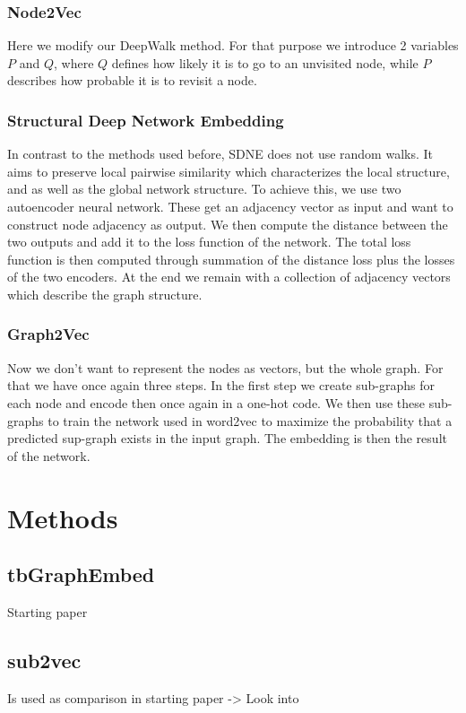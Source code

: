 \documentclass[sigconf]{acmart}
\begin{document}
\subsubsection{Node2Vec}
Here we modify our DeepWalk method. For that purpose we introduce 2 variables \(P\) and \(Q\), where \(Q\) defines how likely it is to go to an unvisited node,
while \(P\) describes how probable it is to revisit a node.

\subsubsection{Structural Deep Network Embedding}
In contrast to the methods used before, SDNE does not use random walks. It aims to preserve local pairwise similarity which characterizes the local structure, and 
as well as the global network structure.
To achieve this, we use two autoencoder neural network. These get an adjacency vector as input and want to construct node adjacency as output.
We then compute the distance between the two outputs and add it to the loss function of the network.
The total loss function is then computed through summation of the distance loss plus the losses of the two encoders.
At the end we remain with a collection of adjacency vectors which describe the graph structure.

\subsubsection{Graph2Vec}
Now we don't want to represent the nodes as vectors, but the whole graph. For that we have once again three steps. 
In the first step we create sub-graphs for each node and encode then once again in a one-hot code. We then use these sub-graphs to train the network used in 
word2vec to maximize the probability that a predicted sup-graph exists in the input graph. The embedding is then the result of the network.
\cite{EmbeddingSummary}
\newpage
\section{Methods}

\subsection{tbGraphEmbed}
Starting paper
\subsection{sub2vec}
Is used as comparison in starting paper -> Look into
\end{document}
